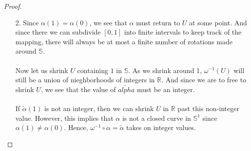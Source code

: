 \documentclass[a4paper,12pt,twoside]{hmcpset}
\begin{document}
\begin{proof}
\begin{itemize}
    \item[2.] Since $\alpha(1) = \alpha(0)$, we see that
    $\alpha$ must return to $U$ at some point. And since there we
    can subdivide $[0, 1]$ into finite intervals to keep track of
    the mapping, there will always be at most a finite number of
    rotations made around $\mathbb{S}$.
    \\
    \\
    Now let us shrink $U$ containing $1$ in $\mathbb{S}$. 
    As we shrink around 1, $\omega^{-1}(U)$ will still be a union of 
    nieghborhoods of integers in $\mathbb{R}$. And since we are to free
    to shrink $U$, we see that the value of $\tilde{alpha}$ 
    must be an integer. 
    \\
    \\
    If $\tilde{\alpha}(1)$ is not an integer, 
    then we can shrink $U$ in $\mathbb{R}$ past this non-integer
    value. However, this implies that $\alpha$ is not a closed
    curve in $\mathbb{S}^1$ since 
    $\alpha(1) \ne \alpha(0)$. Hence, $\omega^{-1}\circ \alpha =
    \tilde{\alpha}$ takes on integer values. 
    \begin{figure}[h!]
        \centering 
            \hspace{1mm}
\end{figure}
\end{itemize}
\end{proof}
\end{document}
